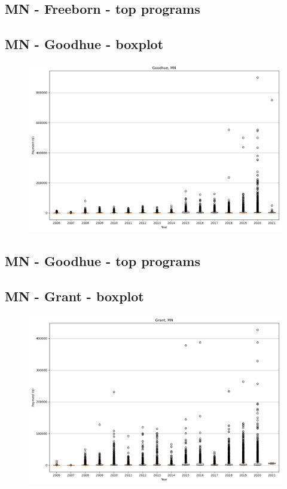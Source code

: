 \subsection*{MN - Freeborn - top programs}

\newpage
\subsection*{MN - Goodhue - boxplot}
\begin{figure}[h]
\centering
\includegraphics[width=7in]{../output/boxplots/counties/Goodhue-MN_boxplot.png}
\end{figure}


\subsection*{MN - Goodhue - top programs}

\newpage
\subsection*{MN - Grant - boxplot}
\begin{figure}[h]
\centering
\includegraphics[width=7in]{../output/boxplots/counties/Grant-MN_boxplot.png}
\end{figure}



